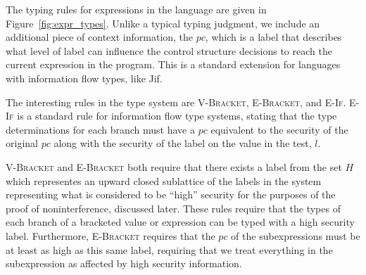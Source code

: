 \documentclass[a4paper,twocolumn]{article}
\theoremstyle{plain}
\theoremstyle{definition}
\begin{document}
The typing rules for expressions in the language are given in
Figure~\ref{fig:expr_types}.  Unlike a typical typing judgment, we include an
additional piece of context information, the $pc$, which is a label that
describes what level of label can influence the control structure decisions to
reach the current expression in the program.  This is a standard extension for
languages with information flow types, like Jif.

The interesting rules in the type system are \textsc{V-Bracket},
\textsc{E-Bracket}, and \textsc{E-If}.  \textsc{E-If} is a standard rule for
information flow type systems, stating that the type determinations for each
branch must have a $pc$ equivalent to the security of the original $pc$ along
with the security of the label on the value in the test, $l$.

\textsc{V-Bracket} and \textsc{E-Bracket} both require that there exists a label
from the set $H$ which representes an upward closed sublattice of the labels in
the system representing what is considered to be ``high'' security for the
purposes of the proof of noninterference, discussed later.  These rules require
that the types of each branch of a bracketed value or expression can be typed
with a high security label.  Furthermore, \textsc{E-Bracket} requires that the
$pc$ of the subexpressions must be at least as high as this same label,
requiring that we treat everything in the subexpression as affected by high
security information.
\end{document}
